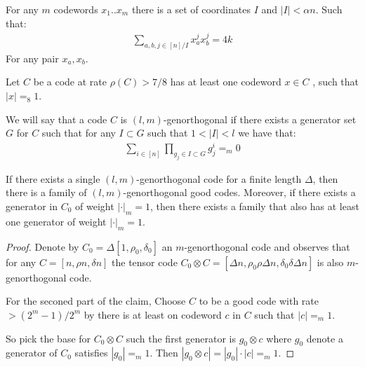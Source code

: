 \documentclass[manuscript,screen,review]{acmart}
\begin{document}
\begin{claim}
  For any $m$ codewords $x_{1}..x_{m}$ there is a set of coordinates $I$ and $|I| < \alpha n$. Such that:  
  \begin{equation*}
    \begin{split}
      \sum_{a,b,j \in [n]/I }x_{a}^{j}x_{b}^{j} = 4k
    \end{split}
  \end{equation*}
  For any pair $x_{a},x_{b}$. 
\end{claim}

\begin{claim}
  \label{claim:oneg}
  Let $C$ be a code at rate $\rho(C) > 7/8 $ has at least one codeword $x \in C$ , such that $|x| =_{8} 1 $.
\end{claim}

\begin{definition}
  We will say that a code $C$ is $(l,m)$-genorthogonal if there exists a generator set $G$ for $C$ such that for any $I \subset G$ such that $1 < |I| < l$ we have that:
  \begin{equation*}
    \begin{split}
      \sum_{i \in [n]}\prod_{g_{j}\in I \subset G}g_{j}^{i} =_{m} 0 
    \end{split}
  \end{equation*}
\end{definition}

\begin{claim}  
  If there exists a single $(l,m)$-genorthogonal code for a finite length $\Delta$, then there is a family of $(l,m)$-genorthogonal good codes. Moreover, if there exists a generator in $C_0$ of weight $|\cdot|_m = 1$, then there exists a family that also has at least one generator of weight $|\cdot|_m = 1$.
\end{claim}
\begin{proof}
  Denote by $C_{0} = \Delta[1,\rho_{0}, \delta_{0}]$ an $m$-genorthogonal code and observes that for any $C = [n,\rho n, \delta n]$ the tensor code $C_{0}\otimes C = [\Delta n, \rho_{0} \rho \Delta n, \delta_{0} \delta \Delta n]$ is also $m$-genorthogonal code. 

  For the seconed part of the claim, Choose $C$ to be a good code with rate $> \left(2^{m}-1\right)/2^{m}$ by  there is at least on codeword $c$ in $C$ such that $|c| =_{m} 1$.

  So pick the base for $C_{0}\otimes C$ such the first generator is $g_{0} \otimes c$ where $g_{0}$ denote a generator of $C_{0}$ satisfies $|g_{0}| =_{m} 1$. 
    Then $|g_{0} \otimes c | = |g_{0}| \cdot |c| =_{m} 1$.  
\end{proof}
\end{document}
